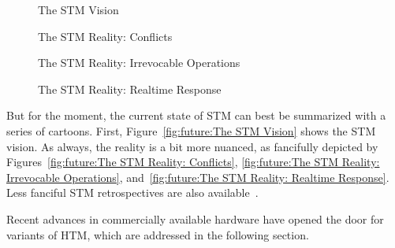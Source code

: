 \begin{figure}[tb]
\centering
{}
\caption{The STM Vision}
\end{figure}

\begin{figure}[tb]
\centering
{}
\caption{The STM Reality: Conflicts}
\end{figure}

\begin{figure}[tb]
\centering
{}
\caption{The STM Reality: Irrevocable Operations}
\end{figure}

\begin{figure}[tb]
\centering
{}
\caption{The STM Reality: Realtime Response}
\end{figure}

But for the moment, the current state of STM
can best be summarized with a series of cartoons.
First,
Figure~\ref{fig:future:The STM Vision}
shows the STM vision.
As always, the reality is a bit more nuanced, as fancifully depicted by
Figures~\ref{fig:future:The STM Reality: Conflicts},
\ref{fig:future:The STM Reality: Irrevocable Operations},
and~\ref{fig:future:The STM Reality: Realtime Response}.
Less fanciful STM retrospectives are also
available~\cite{JoeDuffy2010RetroTM,JoeDuffy2010RetroTM2}.

Recent advances in commercially available hardware have opened the door
for variants of HTM, which are addressed in the following section.

